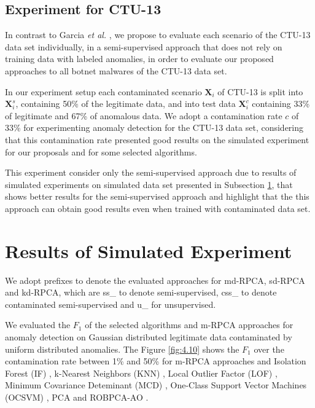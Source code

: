 \subsection{Experiment for CTU-13}
\label{sec:3_CTU13Scenario}

In contrast to Garcia \emph{et al.} \cite{garcia2014empirical}, we propose to evaluate each scenario of the CTU-13 data set individually, in a semi-supervised approach that does not rely on training data with labeled anomalies, in order to evaluate our proposed approaches to all botnet malwares of the CTU-13 data set. 

In our experiment setup each contaminated scenario $\pmb{X}_i$ of CTU-13 is split into $\pmb{X}_i^s$, containing 50\% of the legitimate data, and into test data $\pmb{X}_i^c$ containing 33\% of legitimate and 67\% of anomalous data. We adopt a contamination rate $c$ of 33\% for  experimenting anomaly detection for the CTU-13 data set, considering that this contamination rate presented good results on the simulated experiment for our proposals and for some selected algorithms.

This experiment consider only the semi-supervised approach due to results of simulated experiments on simulated data set presented in Subsection \ref{sec:3_simulated_result}, that shows better results for the semi-supervised approach and highlight that the this approach can obtain good results even when trained with contaminated data set.


\section{Results of Simulated Experiment}
\label{sec:3_simulated_result}

We adopt prefixes to denote the evaluated approaches for md-RPCA, sd-RPCA and kd-RPCA, which are ss\_ to denote semi-supervised, css\_ to denote contaminated semi-supervised and u\_ for unsupervised.

We evaluated the $F_1$ of the selected algorithms and m-RPCA approaches for anomaly detection on Gaussian distributed legitimate data contaminated by uniform distributed anomalies. The Figure \ref{fig:4.10} shows the $F_1$ over the contamination rate between 1\% and 50\% for m-RPCA approaches and Isolation Forest (IF) \cite{liu2008isolation}, k-Nearest Neighbors (KNN) \cite{angiulli2002fast}, Local Outlier Factor (LOF) \cite{breunig2000lof}, Minimum Covariance Deteminant (MCD) \cite{rousseeuw1999fastmcd}, One-Class Support Vector Machines (OCSVM) \cite{scholkopf2001estimating}, PCA \cite{shyu2003novel} and ROBPCA-AO \cite{hubert2009robustskewed}.


